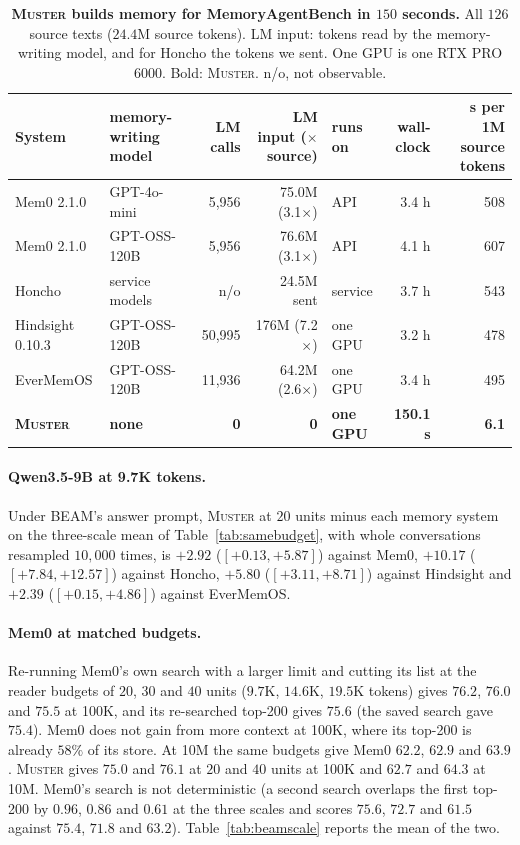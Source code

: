 \documentclass{article}
\newcommand{\ours}{\rowcolor{oursbg}}
\newcommand{\tabfont}{\fontsize{7.5}{8.5}\selectfont\renewcommand{\arraystretch}{1.0}}
\newcommand{\sys}{\textsc{Muster}}
\begin{document}
\begin{table}[!htbp]
\centering\tabfont
\caption{\textbf{\sys{} builds memory for MemoryAgentBench in $150$ seconds.} All $126$ source texts ($24.4$M source tokens). LM input: tokens read by the memory-writing model, and for Honcho the tokens we sent. One GPU is one RTX PRO 6000. Bold: \sys{}. n/o, not observable.}
\label{tab:mabcost}
\setlength{\tabcolsep}{3pt}
\begin{tabular}{llrrlrr}
\toprule
System & memory-writing model & LM calls & LM input ($\times$ source) & runs on & wall-clock & s per 1M source tokens \\
\midrule
Mem0 2.1.0 & GPT-4o-mini & 5{,}956 & 75.0M (3.1$\times$) & API & 3.4 h & 508 \\
Mem0 2.1.0 & GPT-OSS-120B & 5{,}956 & 76.6M (3.1$\times$) & API & 4.1 h & 607 \\
Honcho & service models & n/o & 24.5M sent & service & 3.7 h & 543 \\
Hindsight 0.10.3 & GPT-OSS-120B & 50{,}995 & 176M (7.2$\times$) & one GPU & 3.2 h & 478 \\
EverMemOS & GPT-OSS-120B & 11{,}936 & 64.2M (2.6$\times$) & one GPU & 3.4 h & 495 \\
\midrule
\ours \textbf{\sys{}} & \textbf{none} & \textbf{0} & \textbf{0} & \textbf{one GPU} & \textbf{150.1 s} & \textbf{6.1} \\
\bottomrule
\end{tabular}
\end{table}

\paragraph{Qwen3.5-9B at 9.7K tokens.} Under BEAM's answer prompt, \sys{} at $20$ units minus each memory system on the three-scale mean of Table~\ref{tab:samebudget}, with whole conversations resampled $10{,}000$ times, is $+2.92$ ($[+0.13, +5.87]$) against Mem0, $+10.17$ ($[+7.84, +12.57]$) against Honcho, $+5.80$ ($[+3.11, +8.71]$) against Hindsight and $+2.39$ ($[+0.15, +4.86]$) against EverMemOS.

\paragraph{Mem0 at matched budgets.} Re-running Mem0's own search with a larger limit and cutting its list at the reader
budgets of $20$, $30$ and $40$ units ($9.7$K, $14.6$K, $19.5$K tokens) gives $76.2$, $76.0$ and $75.5$ at 100K, and its
re-searched top-200 gives $75.6$ (the saved search gave $75.4$). Mem0 does not gain from more context at 100K, where its
top-200 is already $58\%$ of its store. At 10M the same budgets give Mem0 $62.2$, $62.9$ and $63.9$. \sys{} gives $75.0$ and $76.1$ at $20$ and $40$ units at 100K and $62.7$ and $64.3$ at 10M. Mem0's search is not deterministic (a second search overlaps the first top-200 by $0.96$,
$0.86$ and $0.61$ at the three scales and scores $75.6$, $72.7$ and $61.5$ against $75.4$, $71.8$ and $63.2$). Table~\ref{tab:beamscale} reports the mean of the two.
\end{document}
